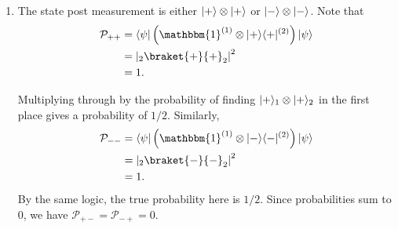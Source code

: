 \documentclass[11pt, letterpaper]{article}
\begin{document}
\begin{enumerate}
\begin{enumerate}
				\begin{align*}
					\mathcal{P}_{\pm,+} &=\bra{\psi } \left( \mathbbm{1}^{(1)} \otimes \ket{+} \bra{+}^{(2)}  \right) \ket{\psi } \\
							    &=\left| _2\braket{+_x}{+}_2 \right| ^2\\
							    &=\frac{1}{2} 
				.\end{align*}
				Multiplying through by the probability of measuring either $\ket{+}_1$ or $\ket{-}_1$ gives probabilities of $\mathcal{P} _{+,+} =\mathcal{P}_{-,+} =1/4$. Since probabilities sum to 1, we have $\mathcal{P}_{\pm,-}=1/2$, and by the same logic we have all other probabilities are $1/4$ as well.
			\item The state post measurement is either $\lvert+\rangle \otimes \lvert+\rangle $ or $\lvert-\rangle \otimes \lvert-\rangle$. Note that
				\begin{align*}
					\mathcal{P}_{++} &=\bra{\psi } \left( \mathbbm{1}^{(1)} \otimes \ket{+} \bra{+}^{(2)}  \right) \ket{\psi } \\
					&=\left|_2 \braket{+}{+} _2 \right| ^2\\
					&=1
				.\end{align*}
				
				Multiplying through by the probability of finding $\lvert+\rangle_1 \otimes \lvert+\rangle_2$ in the first place gives a probability of $1/2$. Similarly,
				\begin{align*}
					\mathcal{P}_{- -} &=\bra{\psi } \left( \mathbbm{1}^{(1)} \otimes \ket{-} \bra{-} ^{(2)}  \right) \ket{\psi } \\
							  &=\left| _2 \braket{-}{-} _2 \right| ^2\\
							  &=1
				.\end{align*}
				By the same logic, the true probability here is $1/2$. Since probabilities sum to $0$, we have $\mathcal{P}_{+-} =\mathcal{P}_{-+} =0$.
		\end{enumerate}
\end{enumerate}
\end{document}
